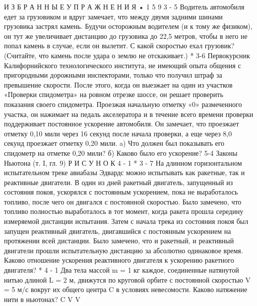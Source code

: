 \documentclass[10pt,oneside]{article}
\begin{document}
И З Б Р А Н Н Ы Е  У П Р А Ж Н Е Н И Я • 1 5 9 \emph{ } 3 - 5 Водитель автомобиля едет за грузовиком и вдруг замечает, что между двумя задними шинами грузовика застрял камень. Будучи осторожным водителем (и к тому же физиком), он тут же увеличивает дистанцию до грузовика до 22,5 метров, чтобы в него не попал камень в случае, если он вылетит. С какой скоростью ехал грузовик? (Считайте, что камень после удара о землю не отскакивает.) \emph{ } * 3-6 Первокурсник Калифорнийского технологического института, не имеющий опыта общения с пригородными дорожными инспекторами, только что получил штраф за превышение скорости. После этого, когда он выезжает на один из участков «Проверки спидометра» на ровном отрезке шоссе, он решает проверить показания своего спидометра. Проезжая начальную отметку «0» размеченного участка, он нажимает на педаль акселератора и в течение всего времени проверки поддерживает постоянное ускорение автомобиля. Он замечает, что проезжает отметку 0,10 мили через 16 секунд после начала проверки, а еще через 8,0 секунд проезжает отметку 0,20 мили. a) Что должен был показывать его спидометр на отметке 0,20 мили? б) Каково было его ускорение? 5-4 Законы Ньютона (т. I, гл. 9) Р И С У Н О К  4 - 1 \emph{ } * 3 - 7 На длинном горизонтальном испытательном треке авиабазы Эдвардс можно испытывать как ракетные, так и реактивные двигатели. В один из дней ракетный двигатель, запущенный из состояния покоя, ускорялся с постоянным ускорением, пока не выработалось топливо, после чего он двигался с постоянной скоростью. Было замечено, что топливо полностью выработалось в тот момент, когда ракета прошла середину измеряемой дистанции испытания. Затем с начала трека из состояния покоя был запущен реактивный двигатель, двигавшийся с постоянным ускорением на протяжении всей дистанции. Было замечено, что и ракетный, и реактивный двигатели прошли испытательную дистанцию за абсолютно одинаковое время. Каково отношение ускорения реактивного двигателя к ускорению ракетного двигателя? * 4 - 1 Два тела массой m = 1 кг каждое, соединенные натянутой нитью длиной L = 2 м, движутся по круговой орбите с постоянной скоростью V = 5 м/с вокруг их общего центра C в условиях невесомости. Каково натяжение нити в ньютонах? C V V\par
\end{document}
